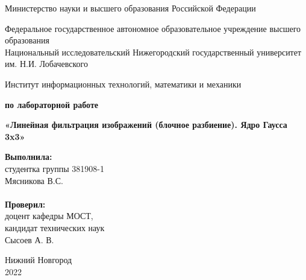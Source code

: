 \documentclass{report}
\begin{document}
\begin{titlepage}

\begin{center}
Министерство науки и высшего образования Российской Федерации
\end{center}

\begin{center}
Федеральное государственное автономное образовательное учреждение высшего образования \\
Национальный исследовательский Нижегородский государственный университет им. Н.И. Лобачевского
\end{center}

\begin{center}
Институт информационных технологий, математики и механики
\end{center}

\vspace{4em}

\begin{center}
\textbf{ по лабораторной работе}
\end{center}
\begin{center}
\textbf{\Large«Линейная фильтрация изображений (блочное разбиение). Ядро Гаусса 3x3»}
\end{center}

\vspace{4em}

\newbox{\lbox}
\newlength{\maxl}
\setlength{\maxl}{\wd\lbox}
\hfill\parbox{7cm}{
\hspace*{5cm}\hspace*{-5cm}\textbf{Выполнила:} \\ студентка группы 381908-1 \\ Мясникова В.С. \\
\\
\hspace*{5cm}\hspace*{-5cm}\textbf{Проверил:}\\ доцент кафедры МОСТ, \\ кандидат технических наук \\ Сысоев А. В.\\}
\vspace{\fill}

\begin{center} Нижний Новгород \\ 2022 \end{center}
\end{titlepage}
\end{document}
